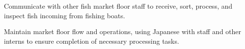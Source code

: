 \documentclass[letterpaper]{deedy-resume_sm} %
\begin{document}
\sectionspace %
\begin{tightitemize}
\item Communicate with other fish market floor staff to receive, sort, process, and inspect fish incoming from fishing boats. 
\item Maintain market floor flow and operations, using Japanese with staff and other interns to ensure completion of necessary processing tasks.
\end{tightitemize}
\sectionspace %

\end{document}
